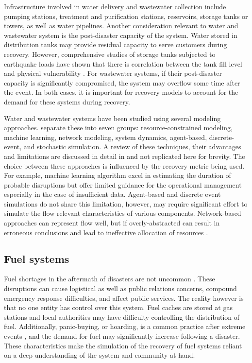 Infrastructure involved in water delivery and wastewater collection include pumping stations, treatment and purification stations, reservoirs, storage tanks or towers, as well as water pipelines. Another consideration relevant to water and wastewater system is the post-disaster capacity of the system. Water stored in distribution tanks may provide residual capacity to serve customers during recovery. However, comprehensive studies of storage tanks subjected to earthquake loads have shown that there is correlation between the tank fill level and physical vulnerability \citep{orourke2000seismic, eidinger2012recent, cooper1997study}. For wastewater systems, if their post-disaster capacity is significantly compromised, the system may overflow some time after the event. In both cases, it is important for recovery models to account for the demand for these systems during recovery.\

Water and wastewater systems have been studied using several modeling approaches. \cite{miles2019community} separate these into seven groups: resource-constrained modeling, machine learning, network modeling, system dynamics, agent-based, discrete-event, and stochastic simulation. A review of these techniques, their advantages and limitations are discussed in detail in \cite{miles2019community} and not replicated here for brevity. The choice between these approaches is influenced by the recovery metric being used. For example, machine learning algorithm excel in estimating the duration of probable disruptions but offer limited guidance for the operational management especially in the case of insufficient data. Agent-based and discrete event simulations do not share this limitation, however, may require significant effort to simulate the flow relevant characteristics of various components. Network-based approaches can represent flow well, but if overly-abstracted can result in erroneous conclusions and lead to ineffective allocation of resources \citep{Hines2010a}. \

\subsection{Fuel systems}
Fuel shortages in the aftermath of disasters are not uncommon \citep{Smythe2013, Holguin-Veras2014}. These disruptions can cause logistical as well as public relations concerns, compound emergency response difficulties, and affect public services. The reality however is that no one entity has control over this system. Fuel caches are stored at gas stations and local authorities may have difficulty controlling the distribution of fuel. Additionally, panic-buying, or hoarding, is a common practice after extreme events \citep{shen2017development, helbing2006disasters}, and the demand for fuel may significantly increase following a disaster. These characteristics make the simulation of the recovery of fuel systems reliant on a deep understanding of the system and community at hand. \

